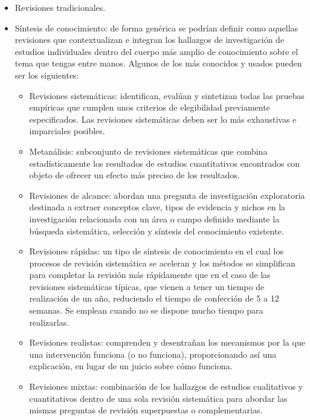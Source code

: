 \begin{itemize}
    \item Revisiones tradicionales. 
    \item Síntesis de conocimiento: de forma genérica se podrían definir como aquellas revisiones que contextualizan e integran los hallazgos de investigación de estudios individuales dentro del cuerpo más amplio de conocimiento sobre el tema que tengas entre manos. Algunos de los más conocidos y usados pueden ser los siguientes:
    \begin{itemize}
        \item Revisiones sistemáticas: identifican, evalúan y sintetizan todas las pruebas empíricas que cumplen unos criterios de elegibilidad previamente especificados. Las revisiones sistemáticas deben ser lo más exhaustivas e imparciales posibles.
        
        \item Metanálisis: subconjunto de revisiones sistemáticas que combina estadísticamente los resultados de estudios cuantitativos encontrados con objeto de ofrecer un efecto más preciso de los resultados.
        
        \item Revisiones de alcance: abordan una pregunta de investigación exploratoria destinada a extraer conceptos clave, tipos de evidencia y nichos en la investigación relacionada con un área o campo definido mediante la búsqueda sistemática, selección y síntesis del conocimiento existente.
        
        \item Revisiones rápidas: un tipo de síntesis de conocimiento en el cual los procesos de revisión sistemática se aceleran y los métodos se simplifican para completar la revisión más rápidamente que en el caso de las revisiones sistemáticas típicas, que vienen a tener un tiempo de realización de un año, reduciendo el tiempo de confección de 5 a 12 semanas. Se emplean cuando no se dispone mucho tiempo para realizarlas.
        
        \item Revisiones realistas: comprenden y desentrañan los mecanismos por la que una intervención funciona (o no funciona), proporcionando así una explicación, en lugar de un juicio sobre cómo funciona.

        \item Revisiones mixtas: combinación de los hallazgos de estudios cualitativos y cuantitativos dentro de una sola revisión sistemática para abordar las mismas preguntas de revisión superpuestas o complementarias.
        

\end{itemize}
\end{itemize}
